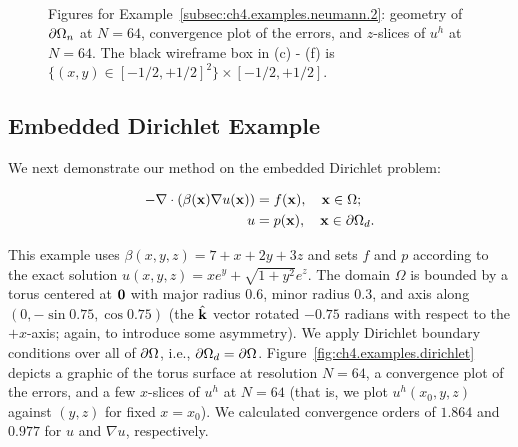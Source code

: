\setlength{\figureheighti}{0.43\textwidth}
\setlength{\figurewidthii}{0.25\textwidth}
\begin{figure}[htbp]
\centering
{}
 \\
\caption{Figures for Example~\ref{subsec:ch4.examples.neumann.2}: geometry of $\partial\Omega_n$ at $N = 64$, convergence plot of the errors, and $z$-slices of $u^h$ at $N = 64$. The black wireframe box in (c) - (f) is $\{(x,y) \in [-1/2,+1/2]^2\} \times [-1/2,+1/2]$.}
\label{fig:ch4.examples.neumann.2}
\end{figure}

\subsection{Embedded Dirichlet Example} \label{subsec:ch4.example.dirichlet}

We next demonstrate our method on the embedded Dirichlet problem:

\begin{align*}
-\nabla \cdot \left( \beta(\mathbf{x}) \nabla u(\mathbf{x}) \right) & = f(\mathbf{x}), \quad \mathbf{x} \in \Omega; \\
u & = p(\mathbf{x}), \quad \mathbf{x} \in \partial\Omega_d.
\end{align*}

This example uses $\beta(x,y,z) = 7 + x + 2y + 3z$ and sets $f$ and $p$ according to the exact solution $u(x,y,z) = x e^y + \sqrt{1 + y^2} e^z$. The domain $\Omega$ is bounded by a torus centered at $\mathbf{0}$ with major radius $0.6$, minor radius $0.3$, and axis along $(0, -\sin 0.75, \cos 0.75)$ (the $\hat{\mathbf{k}}$ vector rotated $-0.75$ radians with respect to the $+x$-axis; again, to introduce some asymmetry). We apply Dirichlet boundary conditions over all of $\partial\Omega$, i.e., $\partial\Omega_d = \partial\Omega$. Figure~\ref{fig:ch4.examples.dirichlet} depicts a graphic of the torus surface at resolution $N = 64$, a convergence plot of the errors, and a few $x$-slices of $u^h$ at $N = 64$ (that is, we plot $u^h(x_0,y,z)$ against $(y,z)$ for fixed $x = x_0$). We calculated convergence orders of $1.864$ and $0.977$ for $u$ and $\nabla u$, respectively.

